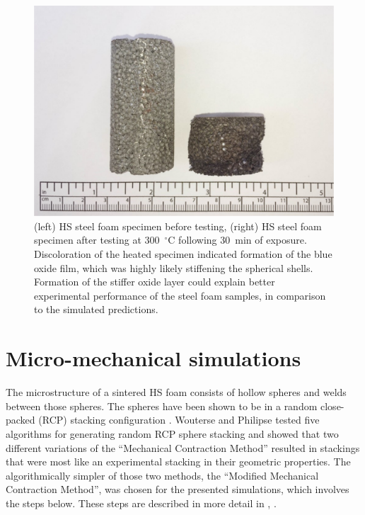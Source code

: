 \documentclass[review]{elsarticle}
\begin{document}
\begin{figure}[htbp]
	\begin{center}
		\includegraphics[width=0.75\linewidth]
		{Tex-Figures/Fig09-Blue_brittleness.pdf}
		\caption{(left) HS steel foam specimen before testing, (right) HS steel foam specimen after testing at 300~$^{\circ}\mathrm{C}$ following 30~min of exposure. Discoloration of the heated specimen indicated formation of the blue oxide film, which was highly likely stiffening the spherical shells. Formation of the stiffer oxide layer could explain better experimental performance of the steel foam samples, in comparison to the simulated predictions.}
		\label{fig:BlueOxide}
	\end{center}
\end{figure}

\FloatBarrier

\section{Micro-mechanical simulations}

The microstructure of a sintered HS foam consists of hollow spheres and welds between those spheres. The spheres have been shown to be in a random close-packed (RCP) stacking configuration \cite{Gaoetal2008}. Wouterse and Philipse \cite{WouPhi2006} tested five algorithms for generating random RCP sphere stacking and showed that two different variations of the ``Mechanical Contraction Method'' resulted in stackings that were most like an experimental stacking in their geometric properties. The algorithmically simpler of those two methods, the ``Modified Mechanical Contraction Method'', was chosen for the presented simulations, which involves the steps below. These steps are described in more detail in \cite{Kansaletal2002}, \cite{WilliamsandPhilipse2003}.
\end{document}
